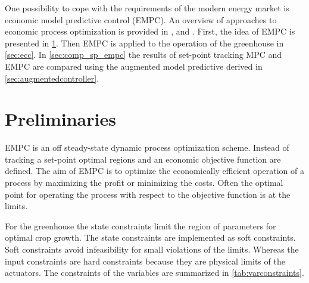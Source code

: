 One possibility to cope with the requirements of the modern energy market is economic model predictive control (EMPC).
An overview of approaches to economic process optimization is provided in \cite{Rawlings.2012}, \cite{Tran.2014} and \cite{Ellis.2016}.
First, the idea of EMPC is presented in \cref{sec:empcs}.
Then EMPC is applied to the operation of the greenhouse in \cref{sec:ecc}.
In \cref{sec:comp_sp_empc} the results of set-point tracking MPC and EMPC are compared using the augmented model predictive derived in \cref{sec:augmentedcontroller}.


\section{Preliminaries}
\label{sec:empcs}

EMPC is an off steady-state dynamic process optimization scheme.
Instead of tracking a set-point optimal regions and an economic objective function are defined.
The aim of EMPC is to optimize the economically efficient operation of a process by maximizing the profit or minimizing the costs.
Often the optimal point for operating the process with respect to the objective function is at the limits.

For the greenhouse the state constraints limit the region of parameters for optimal crop growth.
The state constraints are implemented as soft constraints.
Soft constraints avoid infeasibility for small violations of the limits.
Whereas the input constraints are hard constraints because they are physical limits of the actuators.
The constraints of the variables are summarized in \cref{tab:varconstraints}.

